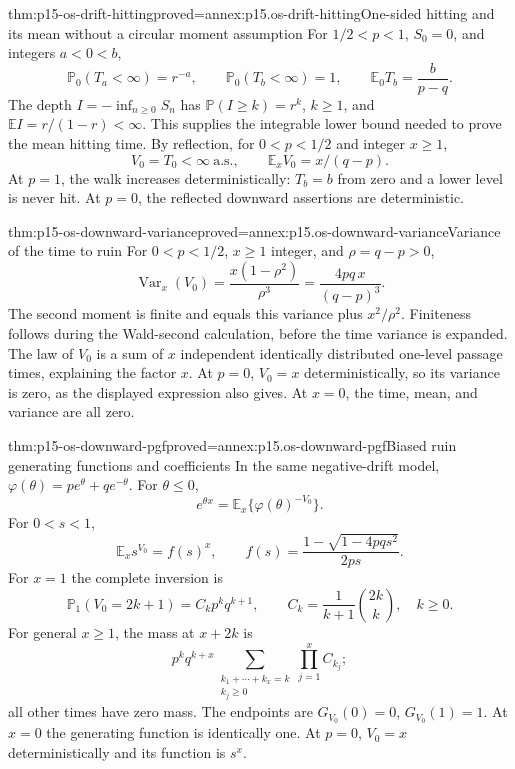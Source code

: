 \begin{hbtheorem}{thm:p15-os-drift-hitting}{proved=annex:p15.os-drift-hitting}{One-sided hitting and its mean without a circular moment assumption}
For \(1/2<p<1\), \(S_0=0\), and integers \(a<0<b\),
\[
 \mathbb P_0(T_a<\infty)=r^{-a},\qquad
 \mathbb P_0(T_b<\infty)=1,\qquad
 \mathbb E_0T_b=\frac b{p-q}.
 \]
The depth \(I=-\inf_{n\geq0}S_n\) has
\(\mathbb P(I\geq k)=r^k\), \(k\geq1\), and
\(\mathbb EI=r/(1-r)<\infty\).
This supplies the integrable lower bound needed to prove the
mean hitting time.
By reflection, for \(0<p<1/2\) and integer \(x\geq1\),
\[
 V_0=T_0<\infty\ \text{a.s.},\qquad
\mathbb E_xV_0=x/(q-p).
\]
At \(p=1\), the walk increases deterministically:
\(T_b=b\) from zero and a lower level is never hit.
At \(p=0\), the reflected downward assertions are deterministic.
\end{hbtheorem}

\begin{hbtheorem}{thm:p15-os-downward-variance}{proved=annex:p15.os-downward-variance}{Variance of the time to ruin}
For \(0<p<1/2\), \(x\geq1\) integer, and
\(\rho=q-p>0\),
\[
 \operatorname{Var}_x(V_0)
       =\frac{x(1-\rho^2)}{\rho^3}
       =\frac{4pq\,x}{(q-p)^3}.
 \]
The second moment is finite and equals this variance plus
\(x^2/\rho^2\). Finiteness follows during the Wald-second
calculation, before the time variance is expanded.
The law of \(V_0\) is a sum of \(x\) independent identically
distributed one-level passage times, explaining the factor \(x\).
At \(p=0\), \(V_0=x\) deterministically, so its variance is zero,
as the displayed expression also gives. At \(x=0\), the time,
mean, and variance are all zero.
\end{hbtheorem}

\begin{hbtheorem}{thm:p15-os-downward-pgf}{proved=annex:p15.os-downward-pgf}{Biased ruin generating functions and coefficients}
In the same negative-drift model,
\(\varphi(\theta)=pe^\theta+qe^{-\theta}\).
For \(\theta\leq0\),
\[
 e^{\theta x}=\mathbb E_x\{\varphi(\theta)^{-V_0}\}.
 \]
For \(0<s<1\),
\[
 \mathbb E_xs^{V_0}=f(s)^x,\qquad
 f(s)=\frac{1-\sqrt{1-4pqs^2}}{2ps}.
 \]
For \(x=1\) the complete inversion is
\[
 \mathbb P_1(V_0=2k+1)=C_kp^kq^{k+1},\qquad
 C_k=\frac1{k+1}\binom{2k}{k},\quad k\geq0.
 \]
For general \(x\geq1\), the mass at \(x+2k\) is
\[
 p^kq^{k+x}
     \sum_{\substack{k_1+\cdots+k_x=k\\k_j\geq0}}
                                 \prod_{j=1}^x C_{k_j};
 \]
all other times have zero mass.
The endpoints are \(G_{V_0}(0)=0\), \(G_{V_0}(1)=1\).
At \(x=0\) the generating function is identically one.
At \(p=0\), \(V_0=x\) deterministically and its function is \(s^x\).
\end{hbtheorem}

